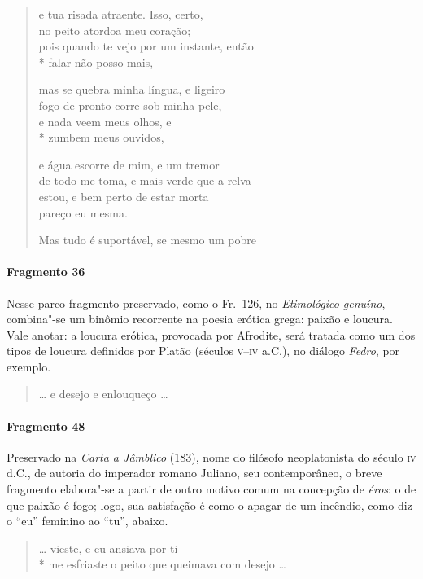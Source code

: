 {\begin{verse}
e tua risada atraente. Isso, certo,\\
no peito atordoa meu coração;\\
pois quando te vejo por um instante, então\\*
falar não posso mais,

mas se quebra minha língua, e ligeiro\\
fogo de pronto corre sob minha pele,\\
e nada veem meus olhos, e\\*
zumbem meus ouvidos,

e água escorre de mim, e um tremor\\
de todo me toma, e mais verde que a relva\\
estou, e bem perto de estar morta\\
pareço eu mesma.

Mas tudo é suportável, se mesmo um pobre 
\end{verse}

\paragraph{Fragmento 36}

{\small Nesse parco fragmento preservado, como o Fr.~126, no \textit{Etimológico genuíno}, combina"-se um binômio recorrente na poesia erótica grega:
paixão e loucura. Vale anotar: a loucura erótica, provocada por Afrodite, será
tratada como um dos tipos de loucura definidos por Platão (séculos \textsc{v}--\textsc{iv} a.C.),
no diálogo \textit{Fedro}, por exemplo.}

\begin{verse}
\ldots{} e desejo e enlouqueço \ldots{}
\end{verse}

\paragraph{Fragmento 48}

{\small Preservado na \textit{Carta a Jâmblico} (183), nome do filósofo neoplatonista do
século \textsc{iv} d.C., de autoria do imperador romano Juliano, seu contemporâneo, o
breve fragmento elabora"-se a partir de outro motivo comum na concepção de
\textit{éros}: o de que paixão é fogo; logo, sua satisfação é como o apagar de
um incêndio, como diz o “eu” feminino ao “tu”, abaixo.}

\begin{verse}
\ldots{} vieste, e eu ansiava por ti --- \\*
me esfriaste o peito que queimava com desejo \ldots{}
\end{verse}

}

